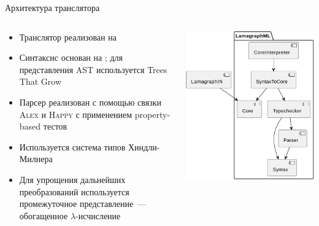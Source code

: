 \documentclass
  [ russian
  , aspectratio=169 %
  ] {beamer}
\begin{document}
\begin{frame}{Архитектура транслятора}
    \begin{columns}
        \begin{column}{0.6\textwidth}
            \begin{itemize}
                \item Транслятор реализован на \Haskell{}
                \item Синтаксис основан на \OCaml{}; для представления AST используется Trees That Grow
                \item Парсер реализован с помощью связки \textsc{Alex} и \textsc{Happy} с применением property-based тестов
                \item Используется система типов Хиндли-Милнера
                \item Для упрощения дальнейших преобразований используется промежуточное представление~--- обогащенное $\lambda$-исчисление %
            \end{itemize}
        \end{column}
        \begin{column}{0.35\textwidth}
            \begin{center}
                \includegraphics[width=\linewidth]{figures/components.pdf}
            \end{center}
        \end{column}
    \end{columns}
\end{frame}
\end{document}
